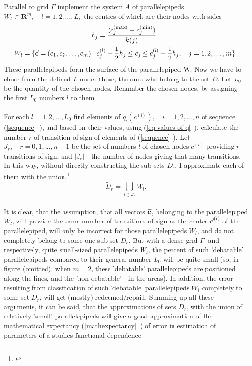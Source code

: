 Parallel to grid $\Gamma$ implement the system $A$ of parallelepipeds $W_{l} \subset \boldsymbol{R}^{m}, \quad l=1,2,\dots,L,$ the centres of which are their nodes with sides
\begin{gather}
h_{j} = \frac{(c_{j}^{(\text{max})}-c_{j}^{(\text{min})})}{k(j)}: \\
W_{l} = \lbrace \vec{\textbf{c}}=(c_{1},c_{2},\dots,c_{m}):c_{j}^{(l)}-\frac{1}{2} h_{j} \leq c_{j} \leq c_{j}^{(l)}+\frac{1}{2} h_{j}, \quad j=1,2,\dots,m \rbrace .
\end{gather}
These parallelepipeds form the surface of the parallelepiped W. Now we have to chose from the defined $L$ nodes those, the ones who belong to the set $D$. Let $L_{0}$ be the quantity of the chosen nodes. Renumber the chosen nodes, by assigning the first $L_{0}$ numbers $l$ to them. \\
\\
For each $l=1,2,\dots,L_{0}$ find elements of $q_{i}(c^{(l)}), \quad i=1,2,\dots,n$ of sequence (\vref{sequence}~), and based on their values, using (\vref{eq-values-of-q}~), calculate the number $r$ of transition of sign of elements of (\vref{sequence}~). Let $J_{r}, \quad r=0,1,\dots,n-1$ be the set of numbers $l$ of chosen nodes $c^{(l)}$ providing $r$ transitions of sign, and $|J_{r}|$ - the number of nodes giving that many transitions. In this way, without directly constructing the sub-sets $D_{r}$, I approximate each of them with the union.\footnote{\cite{smith_eggen_andre_2015}}
\begin{equation}
\tilde{D}_{r} = \bigcup_{l \in J_{r}} W_{l}. \tag*{(\theequation)\protect\footnotemark}
\end{equation}
\\
It is clear, that the assumption, that all vectors $\vec{\textbf{c}}$, belonging to the parallelepiped $W_{l}$, will provide the same number of transitions of sign as the center $\vec{\textbf{c}}^{(l)}$ of the parallelepiped, will only be incorrect for those parallelepipeds $W_{l}$, and do not completely belong to some one sub-set $D_{r}$. But with a dense grid $\Gamma$, and respectively, quite small-sized parallelepipeds $W_{l}$, the percent of such 'debatable' parallelepipeds compared to their general number $L_{0}$ will be quite small (so, in figure (omitted), when $m=2$, these 'debatable' parallelepipeds are positioned along the lines, and the 'non-debatable' - in the areas). In addition, the error resulting from classification of such 'debatable' parallelepipeds $W_{l}$ completely to some set $D_{r}$, will get (mostly) redeemed/repaid. Summing up all these arguments, it can be said, that the approximations of sets $D_{r}$, with the union of relatively 'small' parallelepipeds will give a good  approximation of the mathematical expectancy (\vref{mathexpectancy}~) of error in estimation of parameters of a studies functional dependence:
